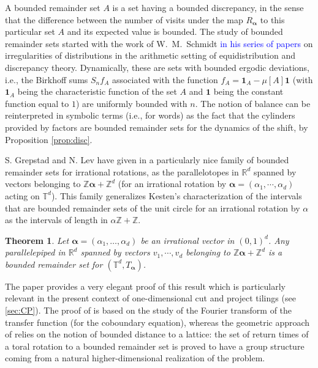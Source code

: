 \documentclass{article}
\newcommand{\tcb}{\textcolor{blue}}
\newtheorem{theorem}[lemma]{Theorem}
\theoremstyle{definition}
\newcommand{\balpha}{\boldsymbol{\alpha}}
\begin{document}
A bounded remainder  set  $A$ is a    set    having a   bounded discrepancy, in the sense that the difference between the number of visits  under the map $R_{\balpha}$ to this particular  set  $A$ and its expected value is bounded. The  study of bounded remainder  sets started with the work of W.~M.~Schmidt \tcb{in his series of papers} on  irregularities of distributions in the  arithmetic setting of equidistribution and  discrepancy theory. Dynamically, these are sets with bounded  ergodic deviations, i.e.,  the Birkhoff sums  $S_n f_A$  associated with 
 the function $f_A={\mathbf 1}_A -\mu[A] {\mathbf 1}$ (with ${\mathbf 1}_A$ being the characteristic function of the set $A$ and ${\mathbf 1}$
 being the constant function equal to $1$)  are uniformly   bounded with $n$. 
The notion of balance  can be reinterpreted   in symbolic terms  (i.e.,  for  words)   as the fact that the cylinders provided  by  factors are bounded remainder sets for the dynamics  of the shift, by Proposition \ref{prop:disc}.


S. Grepstad and N. Lev have given   in   \cite{GL:15}  a     particularly nice  family  of    bounded remainder sets for  irrational rotations,   as  the  parallelotopes in
   ${\mathbb  R}^d$  spanned by vectors belonging to 
  $ {\mathbb Z}\balpha+ {\mathbb Z}^d$  (for an irrational  rotation by $\balpha=(\alpha_1, \cdots, \alpha_d)$  acting on ${\mathbb T}^d$). 
  This  family generalizes  Kesten's  characterization of   the intervals  that are  bounded  remainder sets  of the  unit circle  for an  irrational rotation 
  by $\alpha$  as     the intervals of length in $\alpha{\mathbb Z}+ {\mathbb Z}$.
\begin{theorem}\label{GL:thm} \cite{HKK:17} \cite{GL:15}
Let $\balpha= (\alpha_1,\dots,\alpha_{d}) $  be  an irrational  vector in $(0,1)^d$.
Any parallelepiped in ${\mathbb R}^d$  spanned by vectors
$v_1, \cdots, v_d$  belonging to  ${\mathbb Z} \balpha+  {\mathbb Z}^d$
is a bounded remainder set for $(\mathbb T^d, T_{\balpha})$. \end{theorem}



The paper  \cite{HKK:17} provides a very elegant proof of this result which is  particularly relevant in the present  context of  one-dimensional cut and project tilings (see \cref{sec:CP}).
  The proof of 
    \cite{GL:15}  is  based on the study of the Fourier transform of the transfer function (for the coboundary equation), whereas  
   the geometric approach    of \cite{HKK:17} relies on the notion of bounded distance  to a lattice: the set  of return times of a toral rotation to a bounded remainder set is proved to  have  a group structure coming from a natural higher-dimensional realization of the problem.  
\end{document}
